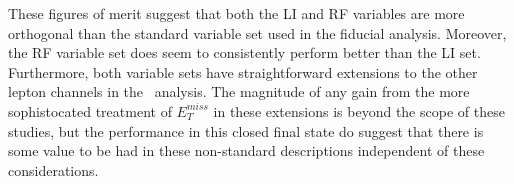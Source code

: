 \begin{comment}
A summary of performance metrics in this document may be found in Table \ref{tab:kahuna}.  


\begin{table}[!htbp]\captionsetup{justification=centering}
\begin{center}
\begin{tabular}{lccc}
\hline\hline
 & Standard &LI &RF\\
\hline
$\hat{\mu}$ & $1.75^{+0.24}_{-0.23}(\textrm{stat.})^{+0.34}_{-0.28}(\textrm{syst.})$ & $1.65^{+0.24}_{-0.23}(\textrm{stat.})^{+0.34}_{-0.28}(\textrm{syst.})$ & $1.50^{+0.24}_{-0.23}(\textrm{stat.})^{+0.34}_{-0.28}(\textrm{syst.})$\\
Asi. $\Delta err\left(\mu\right)$ &  --- & $<1$\%, +4.6\% & -6.5\%, -2.2\%\\
Obs. $\Delta err\left(\hat{\mu}\right)$ &  --- & -7.5\%, -3.7\% & -16\%, -8.8\%\\
\hline
Stat only sig. & 4.78 & 4.39 (-7.9\%) & 4.44 (-6.9\%)\\
Exp. (Asi.) sig. & 2.06 & 1.92 (-6.7\%) & 2.13 (+3.5\%)\\
Exp. (data) sig. & 1.76 & 1.73 (-1.7\%) & 1.80 (+3.4\%)\\
Obs. (data) sig. & 2.87 & 2.79 (-2.8\%) & 2.62 (-8.6\%)\\
\hline\hline
\end{tabular}
\end{center}
\caption{Summary of performance figures for the standard, LI, and RF variable sets.  In the case of the latter two, \% differences are given where relevant.  Differences in errors on $\mu$ are on full systematics and total error, respectively.}
\label{tab:kahuna}
\end{table}
\end{comment}

These figures of merit suggest that both the LI and RF variables are more orthogonal than the standard variable set used in the fiducial analysis.  Moreover, the RF variable set does seem to consistently perform better than the LI set.  Furthermore, both variable sets have straightforward extensions to the other lepton channels in the \vhbb\, analysis.  The magnitude of any gain from the more sophistocated treatment of $E_T^{miss}$ in these extensions is beyond the scope of these studies, but the performance in this closed final state do suggest that there is some value to be had in these non-standard descriptions independent of these considerations.

